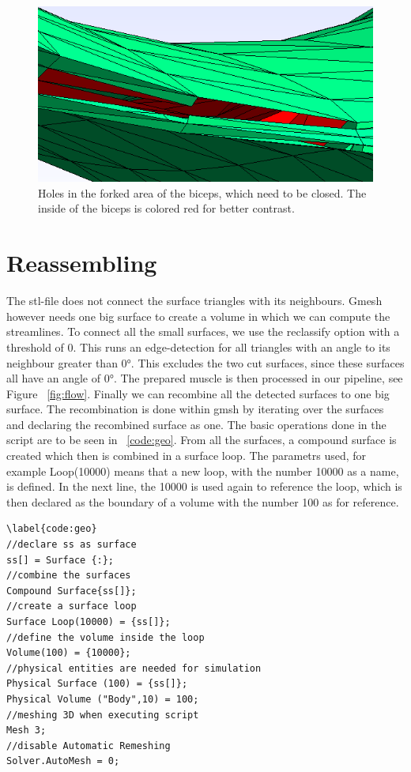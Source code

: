 \documentclass[preprint,journal]{vgtc}       %
\begin{document}
\begin{figure}
	\begin{center}
		\includegraphics[width = .6\linewidth]{holes.png}
	\end{center}
	\caption{Holes in the forked area of the biceps, which need to be closed. The inside of the biceps is colored red for better contrast.}
	\label{fig:holes}
\end{figure}

\section{Reassembling}
The stl-file does not connect the surface triangles with its neighbours. 
Gmesh however needs one big surface to create a volume in which we can compute the streamlines. 
To connect all the small surfaces, we use the reclassify option with a threshold of 0.
This runs an edge-detection for all triangles with an angle to its neighbour greater than \ang{0}. 
This excludes the two cut surfaces, since these surfaces all have an angle of \ang{0}. 
The prepared muscle is then processed in our pipeline, see Figure ~\ref{fig:flow}. 
Finally we can recombine all the detected surfaces to one big surface. 
The recombination is done within gmsh by iterating over the surfaces and declaring the recombined surface as one. 
The basic operations done in the script are to be seen in ~\ref{code:geo}. 
From all the surfaces, a compound surface is created which then is combined in a surface loop. 
The parametrs used, for example Loop(10000) means that a new loop, with the number 10000 as a name, is defined. 
In the next line, the 10000 is used again to reference the loop, which is then declared as the boundary of a volume with the number 100 as for reference. 

\begin{verbatim}
\label{code:geo}
//declare ss as surface
ss[] = Surface {:};
//combine the surfaces
Compound Surface{ss[]};
//create a surface loop
Surface Loop(10000) = {ss[]};
//define the volume inside the loop
Volume(100) = {10000};
//physical entities are needed for simulation
Physical Surface (100) = {ss[]};
Physical Volume ("Body",10) = 100;
//meshing 3D when executing script
Mesh 3;
//disable Automatic Remeshing
Solver.AutoMesh = 0;
\end{verbatim}
\end{document}
